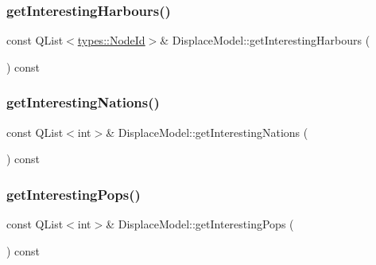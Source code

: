 \subsubsection{\texorpdfstring{getInterestingHarbours()}{getInterestingHarbours()}}
{\footnotesize\ttfamily const Q\+List$<$\mbox{\hyperlink{classtypes_1_1_node_id}{types\+::\+Node\+Id}}$>$\& Displace\+Model\+::get\+Interesting\+Harbours (\begin{DoxyParamCaption}{ }\end{DoxyParamCaption}) const\hspace{0.3cm}{\ttfamily [inline]}}

\mbox{\label{class_displace_model_a7f17ab649e2c46ce65986cb4b285945d}} 
\subsubsection{\texorpdfstring{getInterestingNations()}{getInterestingNations()}}
{\footnotesize\ttfamily const Q\+List$<$int$>$\& Displace\+Model\+::get\+Interesting\+Nations (\begin{DoxyParamCaption}{ }\end{DoxyParamCaption}) const\hspace{0.3cm}{\ttfamily [inline]}}

\mbox{\label{class_displace_model_a95deb9ec411521da932424a4161cff26}} 
\subsubsection{\texorpdfstring{getInterestingPops()}{getInterestingPops()}}
{\footnotesize\ttfamily const Q\+List$<$int$>$\& Displace\+Model\+::get\+Interesting\+Pops (\begin{DoxyParamCaption}{ }\end{DoxyParamCaption}) const\hspace{0.3cm}{\ttfamily [inline]}}

\mbox{\label{class_displace_model_a088dd1692b3779724d174b17f6a79514}} 
